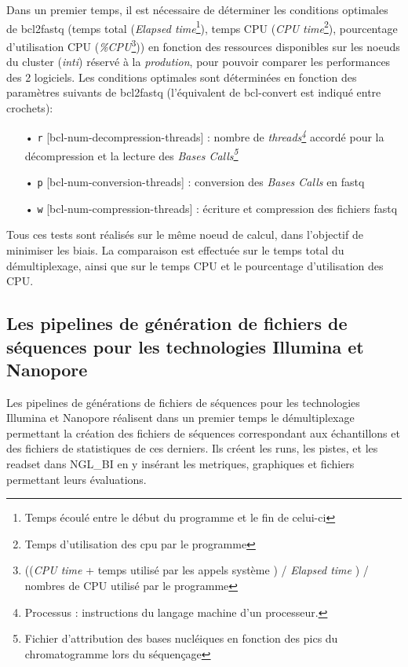 Dans un premier temps, il est nécessaire de déterminer les conditions optimales de bcl2fastq (temps total (\emph{Elapsed time}\footnote{Temps écoulé entre le début du programme et le fin de celui-ci}), temps CPU (\emph{CPU time}\footnote{Temps d'utilisation des cpu par le programme}), pourcentage d'utilisation CPU (\emph{\%CPU}\footnote{((\emph{CPU time} + temps utilisé par les appels système ) / \emph{Elapsed time} ) / nombres de CPU utilisé par le programme})) en fonction des ressources disponibles sur les noeuds du cluster (\emph{inti}) réservé à la \emph{prodution}, pour pouvoir comparer les performances des 2 logiciels. Les conditions optimales sont déterminées en fonction des paramètres suivants de bcl2fastq (l'équivalent de bcl-convert est indiqué entre crochets): \\
\begin{itemize}
    \item[•] \texttt{r} [bcl-num-decompression-threads] : nombre de \emph{threads\footnote{Processus : instructions du langage machine d'un processeur.}} accordé pour la décompression et la lecture des \emph{Bases Calls\footnote{Fichier d'attribution des bases nucléiques en fonction des pics du chromatogramme lors du séquençage}}
    \item[•] \texttt{p} [bcl-num-conversion-threads] : conversion des \emph{Bases Calls} en fastq
    \item[•] \texttt{w} [bcl-num-compression-threads] : écriture et compression des fichiers fastq\\
\end{itemize}

Tous ces tests sont réalisés sur le même noeud de calcul, dans l'objectif de minimiser les biais. La comparaison est effectuée sur le temps total du démultiplexage, ainsi que sur le temps CPU et le pourcentage d'utilisation des CPU.

\subsection{Les pipelines de génération de fichiers de séquences pour les technologies Illumina et Nanopore}
Les pipelines de générations de fichiers de séquences pour les technologies Illumina et Nanopore réalisent dans un premier temps le démultiplexage permettant la création des fichiers de séquences correspondant aux échantillons et des fichiers de statistiques de ces derniers. Ils créent les runs, les pistes, et les readset dans NGL\_BI en y insérant les metriques, graphiques et fichiers permettant leurs évaluations.\\

